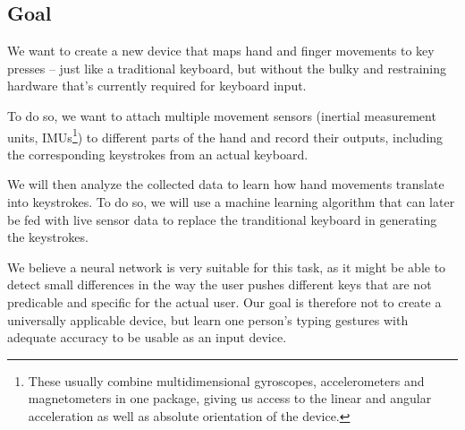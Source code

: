 \subsection{Goal}

We want to create a new device that maps hand and finger movements to key
presses -- just like a traditional keyboard, but without the bulky and
restraining hardware that's currently required for keyboard input.

To do so, we want to attach multiple movement sensors (inertial measurement
units, IMUs\footnote{These usually combine multidimensional gyroscopes,
accelerometers and magnetometers in one package, giving us access to the linear
and angular acceleration as well as absolute orientation of the device.}) to
different parts of the hand and record their outputs, including the
corresponding keystrokes from an actual keyboard.

We will then analyze the collected data to learn how hand movements translate
into keystrokes. To do so, we will use a machine learning algorithm that can
later be fed with live sensor data to replace the tranditional keyboard in
generating the keystrokes.

We believe a neural network is very suitable for this task, as it might be able
to detect small differences in the way the user pushes different keys that are
not predicable and specific for the actual user. Our goal is therefore not to
create a universally applicable device, but learn one person's typing gestures
with adequate accuracy to be usable as an input device.
